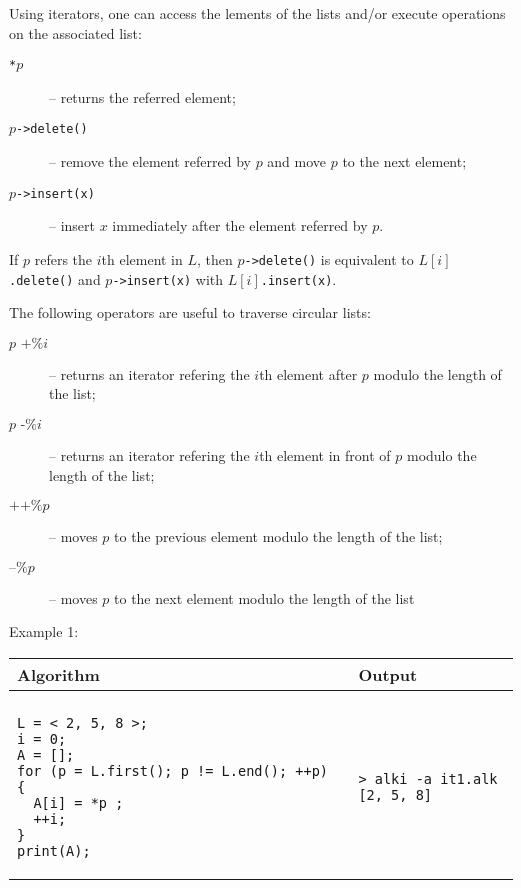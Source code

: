 \documentclass[a4paper]{report}
\begin{document}
Using iterators, one can access the lements of the lists and/or execute operations on the associated list:
\begin{description}
\item[\texttt{*}$p$]  -- returns the referred element;
\item[$p$\texttt{->delete()}] -- remove the element referred by $p$ and move $p$ to the next element;
\item[$p$\texttt{->insert(x)}] -- insert $x$ immediately after the element referred by $p$.
\end{description}

If $p$ refers the $i$th element in $L$, then $p$\texttt{->delete()} is equivalent to $L[i]$\texttt{.delete()} and $p$\texttt{->insert(x)} with $L[i]$\texttt{.insert(x)}.


The following operators are useful to traverse circular lists:
\begin{description}
\item[$p\texttt{ +\% }i$] -- returns an iterator refering the $i$th element after $p$ modulo the length of the list;
\item[$p\texttt{ -\% }i$] -- returns an iterator refering the $i$th element in front of $p$ modulo the length of the list;
\item[$\texttt{++\%}p$] -- moves $p$ to the previous element modulo the length of the list;
\item[$\texttt{--\%}p$] -- moves $p$ to the next element modulo the length of the list
\end{description}

Example 1:
\begin{center}
\begin{tabular}{ll}
Algorithm & Output\\
\hline
\\
\begin{minipage}{.45\textwidth}
\begin{verbatim}
L = < 2, 5, 8 >;
i = 0;
A = [];
for (p = L.first(); p != L.end(); ++p) {
  A[i] = *p ;
  ++i;
}
print(A);
\end{verbatim}
\end{minipage}
&
\begin{minipage}{.45\textwidth}
\begin{verbatim}
> alki -a it1.alk 
[2, 5, 8]
\end{verbatim}
\end{minipage}
\end{tabular}
\end{center}
\end{document}
